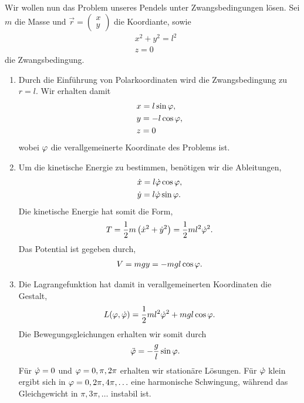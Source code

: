 \begin{bsp}
Wir wollen nun das Problem unseres Pendels unter Zwangsbedingungen lösen.
Sei $m$ die Masse und $\vec{r} = \begin{pmatrix}x\\y\end{pmatrix}$ die
Koordiante, sowie
\begin{align*}
&x^2+y^2 = l^2\\
&z = 0
\end{align*}
die Zwangsbedingung.
\begin{enumerate}[label=\arabic{*}.)]
  \item Durch die Einführung von Polarkoordinaten wird die Zwangsbedingung zu
  $r=l$. Wir erhalten damit
\begin{align*}
&x = l\sin\varphi,\\
&y = -l\cos\varphi,\\
&z = 0
\end{align*} 
wobei $\varphi$ die verallgemeinerte Koordinate des Problems ist.
\item Um die kinetische Energie zu bestimmen, benötigen wir die Ableitungen,
\begin{align*}
&\dot{x} = l\dot{\varphi}\cos\varphi,\\
&\dot{y} = l\dot{\varphi}\sin\varphi.
\end{align*}
Die kinetische Energie hat somit die Form,
\begin{align*}
T = \frac{1}{2}m\left(\dot{x}^2+\dot{y}^2\right) = \frac{1}{2}m l^2\dot{\varphi}^2.
\end{align*}
Das Potential ist gegeben durch,
\begin{align*}
V = mgy = -mgl\cos\varphi.
\end{align*}
\item Die Lagrangefunktion hat damit in verallgemeinerten Koordinaten die
Gestalt,
\begin{align*}
L(\varphi,\dot{\varphi}) = \frac{1}{2}ml^2\dot{\varphi}^2+mgl\cos\varphi.
\end{align*}
Die Bewegungsgleichungen erhalten wir somit durch
\begin{align*}
&\ddot{\varphi} = -\frac{g}{l}\sin\varphi.
\end{align*}
Für $\dot{\varphi}=0$ und $\varphi=0,\pi,2\pi$ erhalten wir stationäre Lösungen.
Für $\dot{\varphi}$ klein ergibt sich in $\varphi=0,2\pi,4\pi,\ldots$ eine harmonische
Schwingung, während das Gleichgewicht in $\pi,3\pi,\ldots$ instabil ist.\bsphere
\end{enumerate}
\end{bsp}

